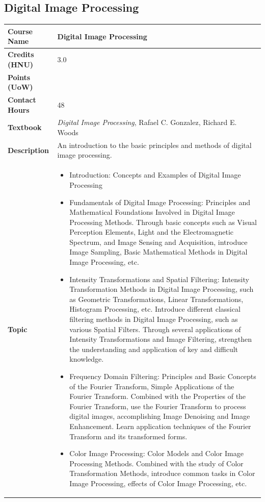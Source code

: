 \documentclass{article}
\begin{document}
\subsection{Digital Image Processing}
\renewcommand{\arraystretch}{1.5} %
\begin{longtable}{|p{3cm}|p{10cm}|}
\hline
\textbf{Course Name} & Digital Image Processing \\
\hline
\textbf{Credits (HNU)} & 3.0 \\
\hline
\textbf{Points (UoW)} & \\
\hline
\textbf{Contact Hours} & 48 \\
\hline
\textbf{Textbook} & \emph{Digital Image Processing}, Rafael C. Gonzalez, Richard E. Woods \\
\hline
\textbf{Description} & An introduction to the basic principles and methods of digital image processing. \\
\hline
\textbf{Topic} & 
\begin{itemize}
    \item Introduction: Concepts and Examples of Digital Image Processing
    \item Fundamentals of Digital Image Processing: Principles and Mathematical Foundations Involved in Digital Image Processing Methods. Through basic concepts such as Visual Perception Elements, Light and the Electromagnetic Spectrum, and Image Sensing and Acquisition, introduce Image Sampling, Basic Mathematical Methods in Digital Image Processing, etc.
    \item Intensity Transformations and Spatial Filtering: Intensity Transformation Methods in Digital Image Processing, such as Geometric Transformations, Linear Transformations, Histogram Processing, etc. Introduce different classical filtering methods in Digital Image Processing, such as various Spatial Filters. Through several applications of Intensity Transformations and Image Filtering, strengthen the understanding and application of key and difficult knowledge.
    \item Frequency Domain Filtering: Principles and Basic Concepts of the Fourier Transform, Simple Applications of the Fourier Transform. Combined with the Properties of the Fourier Transform, use the Fourier Transform to process digital images, accomplishing Image Denoising and Image Enhancement. Learn application techniques of the Fourier Transform and its transformed forms.
    \item Color Image Processing: Color Models and Color Image Processing Methods. Combined with the study of Color Transformation Methods, introduce common tasks in Color Image Processing, effects of Color Image Processing, etc.

\end{itemize}
\end{longtable}
\end{document}
